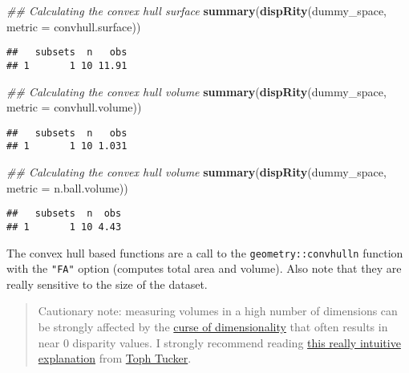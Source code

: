 \documentclass[
]{book}
\newenvironment{Shaded}{\begin{snugshade}}{\end{snugshade}}
\newcommand{\CommentTok}[1]{\textcolor[rgb]{0.56,0.35,0.01}{\textit{#1}}}
\newcommand{\DataTypeTok}[1]{\textcolor[rgb]{0.13,0.29,0.53}{#1}}
\newcommand{\KeywordTok}[1]{\textcolor[rgb]{0.13,0.29,0.53}{\textbf{#1}}}
\newcommand{\NormalTok}[1]{#1}
\begin{document}
\begin{Shaded}
\begin{Highlighting}[]
\CommentTok{\#\# Calculating the convex hull surface}
\KeywordTok{summary}\NormalTok{(}\KeywordTok{dispRity}\NormalTok{(dummy\_space, }\DataTypeTok{metric =}\NormalTok{ convhull.surface))}
\end{Highlighting}
\end{Shaded}

\begin{verbatim}
##   subsets  n   obs
## 1       1 10 11.91
\end{verbatim}

\begin{Shaded}
\begin{Highlighting}[]
\CommentTok{\#\# Calculating the convex hull volume}
\KeywordTok{summary}\NormalTok{(}\KeywordTok{dispRity}\NormalTok{(dummy\_space, }\DataTypeTok{metric =}\NormalTok{ convhull.volume))}
\end{Highlighting}
\end{Shaded}

\begin{verbatim}
##   subsets  n   obs
## 1       1 10 1.031
\end{verbatim}

\begin{Shaded}
\begin{Highlighting}[]
\CommentTok{\#\# Calculating the convex hull volume}
\KeywordTok{summary}\NormalTok{(}\KeywordTok{dispRity}\NormalTok{(dummy\_space, }\DataTypeTok{metric =}\NormalTok{ n.ball.volume))}
\end{Highlighting}
\end{Shaded}

\begin{verbatim}
##   subsets  n  obs
## 1       1 10 4.43
\end{verbatim}

The convex hull based functions are a call to the \texttt{geometry::convhulln} function with the \texttt{"FA"} option (computes total area and volume).
Also note that they are really sensitive to the size of the dataset.

\begin{quote}
Cautionary note: measuring volumes in a high number of dimensions can be strongly affected by the \href{https://en.wikipedia.org/wiki/Curse_of_dimensionality}{curse of dimensionality} that often results in near 0 disparity values. I strongly recommend reading \href{https://beta.observablehq.com/@tophtucker/theres-plenty-of-room-in-the-corners}{this really intuitive explanation} from \href{https://github.com/tophtucker}{Toph Tucker}.
\end{quote}
\end{document}
